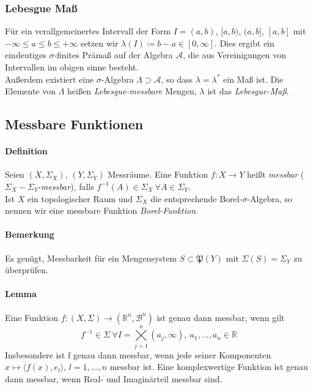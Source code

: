 \documentclass[12pt,a4paper,fleqn]{article}
\begin{document}
\subsubsection*{Lebesgue Maß}
Für ein verallgemeinertes Intervall der Form $I = (a, b)$, $[a, b)$, $(a, b]$, $[a, b]$ mit\linebreak \mbox{$-\infty \leq a \leq b \leq +\infty$} setzen wir $\lambda(I) \coloneqq b - a \in [0, \infty]$. Dies ergibt ein eindeutiges $\sigma$-finites Prämaß auf der Algebra $\mathcal{A}$, die aus Vereinigungen von Intervallen im obigen sinne besteht.\\
Außerdem existiert eine $\sigma$-Algebra $\Lambda \supset \mathcal{A}$, so dass $\lambda = \lambda^*$ ein Maß ist. Die Elemente von $\Lambda$ heißen \textit{Lebesgue-messbare} Mengen, $\lambda$ ist das \textit{Lebesgue-Maß}.

\subsection{Messbare Funktionen}
\paragraph{Definition} Seien $(X, \Sigma_X)$, $(Y, \Sigma_Y)$ Messräume. Eine Funktion $f\colon X \rightarrow Y$ heißt \textit{messbar} ($\Sigma_X-\Sigma_Y$-\textit{messbar}), falls $f^{-1}(A) \in \Sigma_X \ \forall A \in \Sigma_Y$.\\
Ist $X$ ein topologischer Raum und $\Sigma_X$ die entsprechende Borel-$\sigma$-Algebra, so nennen wir eine messbare Funktion \textit{Borel-Funktion}.

\paragraph{Bemerkung} Es genügt, Messbarkeit für ein Mengensystem $S \subset \mathfrak{P}(Y)$ mit ${\Sigma(S) = \Sigma_Y}$ zu überprüfen.

\paragraph{Lemma} Eine Funktion $f\colon (X, \Sigma)\rightarrow (\mathbb{R}^n, \mathcal{B}^n)$ ist genau dann messbar, wenn gilt
\begin{displaymath}
f^{-1} \in \Sigma \ \forall I = \bigtimes\limits_{j = 1}^n (a_j, \infty),\ a_1, \dots, a_n \in \mathbb{R}
\end{displaymath}
Insbesondere ist f genau dann messbar, wenn jede seiner Komponenten $x \mapsto \langle f(x), e_l \rangle$, $l = 1, \dots, n$ messbar ist. Eine komplexwertige Funktion ist genau dann messbar, wenn Real- und Imaginärteil messbar sind.
\end{document}
